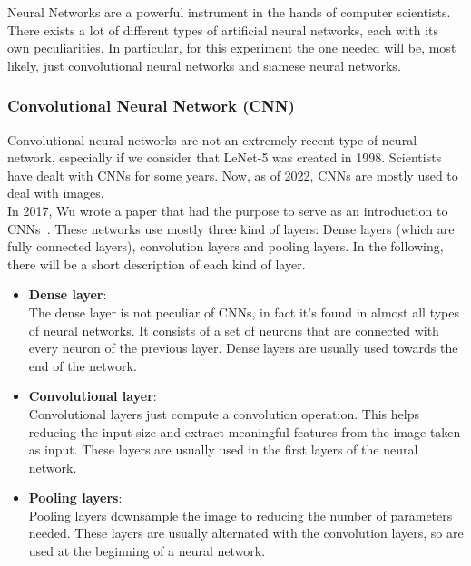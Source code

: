 \documentclass[conference]{IEEEtran}
\begin{document}
				Neural Networks are a powerful instrument in the hands of computer scientists. There exists a lot of different types of artificial neural networks, each with its own peculiarities. In particular, for this 
				experiment the one needed will be, most likely, just convolutional neural networks and siamese neural networks. 
			
				\subsubsection{Convolutional Neural Network (CNN)}
				
					Convolutional neural networks are not an extremely recent type of neural network, especially if we consider that LeNet-5 was created in 1998. Scientists have dealt with CNNs for some years. Now, as of 2022, 
					CNNs are mostly used to deal with images.\\
					In 2017, Wu wrote a paper that had the purpose to serve as an introduction to CNNs~\cite{wu2017introduction}. These networks use mostly three kind of layers: Dense layers (which are fully connected layers), 
					convolution layers and pooling layers. In the following, there will be a short description of each kind of layer. 
					\begin{itemize}
						
						\item \textbf{Dense layer}:\\
							The dense layer is not peculiar of CNNs, in fact it's found in almost all types of neural networks. It consists of a set of neurons that are connected with every neuron of the previous 
							layer. Dense layers are usually used towards the end of the network.
						
						\item \textbf{Convolutional layer}:\\
							Convolutional layers just compute a convolution operation. This helps reducing the input size and extract meaningful features from the image taken as input. These layers are usually used 
							in the first layers of the neural network.
						
						\item \textbf{Pooling layers}:\\
							Pooling layers downsample the image to reducing the number of parameters needed. These layers are usually alternated with the convolution layers, so are used at the beginning of a neural network.
							
					\end{itemize}
					
\end{document}
